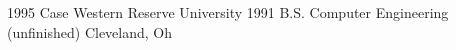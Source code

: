 
\begin{education}
	\school
	  {1995}	{Case Western Reserve University}
	  {1991}	{B.S. Computer Engineering \footnotesize{(unfinished)}}
	  			{Cleveland, Oh}

\end{education}
